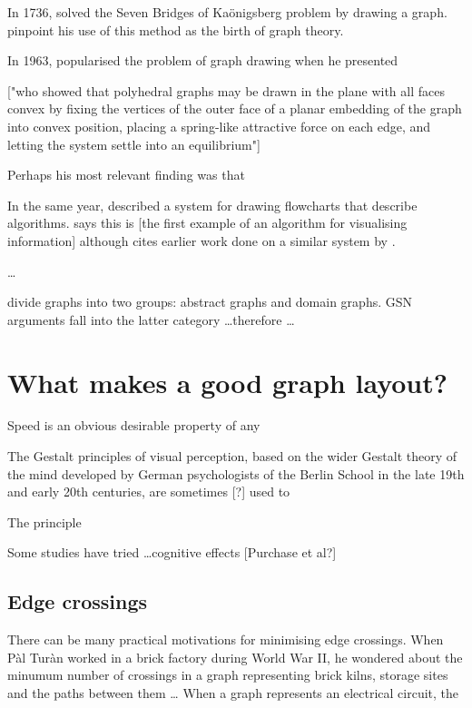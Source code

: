 \documentclass[authoryearcitations]{UoYCSproject}
\begin{document}
In 1736, \citet{euler} solved the Seven Bridges of Ka\"{o}nigsberg problem by drawing a graph.
\citet{ismail2009some}
pinpoint his use of this method as the birth of graph theory.

In 1963, \citet{tutte} popularised the problem of graph drawing when he presented 


["who showed that polyhedral graphs may be drawn in the plane with all faces convex by fixing the vertices of the outer face of a planar embedding of the graph into convex position, placing a spring-like attractive force on each edge, and letting the system settle into an equilibrium"]

Perhaps his most relevant finding was that 

In the same year, \citet{Knuth63} described a system for drawing flowcharts that describe algorithms. \citet{battista}  says this is [the first example of an algorithm for visualising information] although \citeauthor{Knuth63} cites earlier work done on a similar system by \citet{haibt1959}.




\ldots

\citet{huang2007effects} divide graphs into two groups: abstract graphs and domain graphs.
GSN arguments fall into the latter category \ldots  therefore \ldots
{}


\section{What makes a good graph layout?}

Speed is an obvious desirable property of any 

The Gestalt principles of visual perception, based on the wider Gestalt theory of the mind developed by German psychologists of the Berlin School in the late 19th and early 20th centuries, are sometimes [?] used to 

The principle 

Some studies have tried \ldots cognitive effects [Purchase et al?]

\subsection{Edge crossings}

There can be many practical motivations for minimising edge crossings.
When P\`{a}l Tur\`{a}n worked in a brick factory during World War II,
he wondered about the minumum number of crossings in a graph representing
brick kilns, storage sites and the paths between them \ldots
When a graph represents an electrical circuit, the  
\end{document}
